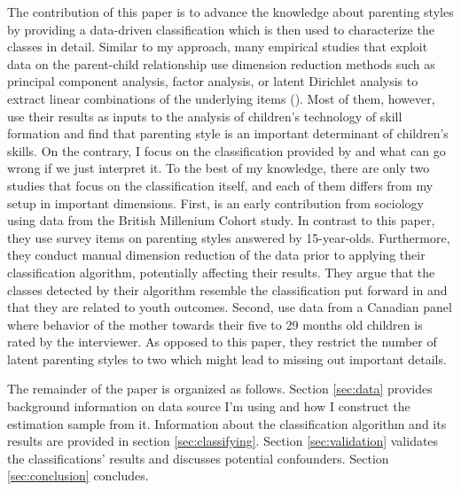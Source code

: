 The contribution of this paper is to advance the knowledge about parenting styles by providing a data-driven classification which is then used to characterize the classes in detail. Similar to my approach, many empirical studies that exploit data on the parent-child relationship use dimension reduction methods such as principal component analysis, factor analysis, or latent Dirichlet analysis to extract linear combinations of the underlying items (\cite{ermischOriginsSocialImmobility2008, chanParentingStyleYouth2011, fioriniHowAllocationChildren2014, bonoEarlyMaternalTime2016, cobb-clarkParentingStyleInvestment2019, zumbuehlParentalInvolvementIntergenerational2020, rauhParentingTypes2020}). Most of them, however, use their results as inputs to the analysis of children's technology of skill formation and find that parenting style is an important determinant of children's skills. On the contrary, I focus on the classification provided by and what can go wrong if we just interpret it. To the best of my knowledge, there are only two studies that focus on the classification itself, and each of them differs from my setup in important dimensions. First, \textcite{chanParentingStyleYouth2011} is an early contribution from sociology using data from the British Millenium Cohort study. In contrast to this paper, they use survey items on parenting styles answered by 15-year-olds. Furthermore, they conduct manual dimension reduction of the data prior to applying their classification algorithm, potentially affecting their results. They argue that the classes detected by their algorithm resemble the classification put forward in \textcite{baumrindChildCarePractices1967} and that they are related to youth outcomes. Second, \textcite{rauhParentingTypes2020} use data from a Canadian panel where behavior of the mother towards their five to 29 months old children is rated by the interviewer. As opposed to this paper, they restrict the number of latent parenting styles to two which might lead to missing out important details.

The remainder of the paper is organized as follows. Section \ref{sec:data} provides background information on data source I'm using and how I construct the estimation sample from it. Information about the classification algorithm and its results are provided in section \ref{sec:classifying}. Section \ref{sec:validation} validates the classifications' results and discusses potential confounders. Section \ref{sec:conclusion} concludes.


